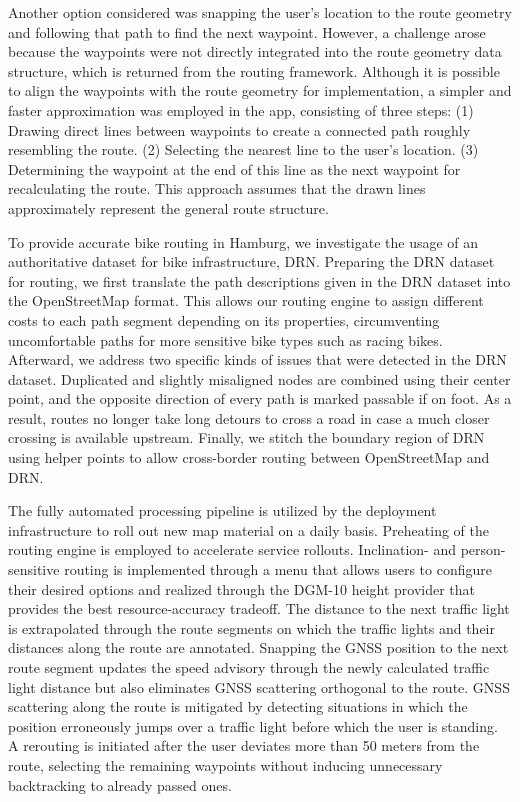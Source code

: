 Another option considered was snapping the user's location to the route geometry and following that path to find the next waypoint. However, a challenge arose because the waypoints were not directly integrated into the route geometry data structure, which is returned from the routing framework. Although it is possible to align the waypoints with the route geometry for implementation, a simpler and faster approximation was employed in the app, consisting of three steps: (1) Drawing direct lines between waypoints to create a connected path roughly resembling the route. (2) Selecting the nearest line to the user's location. (3) Determining the waypoint at the end of this line as the next waypoint for recalculating the route. This approach assumes that the drawn lines approximately represent the general route structure.

\begin{Summary}
To provide accurate bike routing in Hamburg, we investigate the usage of an authoritative dataset for bike infrastructure, DRN. Preparing the DRN dataset for routing, we first translate the path descriptions given in the DRN dataset into the OpenStreetMap format. This allows our routing engine to assign different costs to each path segment depending on its properties, circumventing uncomfortable paths for more sensitive bike types such as racing bikes. Afterward, we address two specific kinds of issues that were detected in the DRN dataset. Duplicated and slightly misaligned nodes are combined using their center point, and the opposite direction of every path is marked passable if on foot. As a result, routes no longer take long detours to cross a road in case a much closer crossing is available upstream. Finally, we stitch the boundary region of DRN using helper points to allow cross-border routing between OpenStreetMap and DRN. 

The fully automated processing pipeline is utilized by the deployment infrastructure to roll out new map material on a daily basis. Preheating of the routing engine is employed to accelerate service rollouts. Inclination- and person-sensitive routing is implemented through a menu that allows users to configure their desired options and realized through the DGM-10 height provider that provides the best resource-accuracy tradeoff. The distance to the next traffic light is extrapolated through the route segments on which the traffic lights and their distances along the route are annotated. Snapping the GNSS position to the next route segment updates the speed advisory through the newly calculated traffic light distance but also eliminates GNSS scattering orthogonal to the route. GNSS scattering along the route is mitigated by detecting situations in which the position erroneously jumps over a traffic light before which the user is standing. A rerouting is initiated after the user deviates more than 50 meters from the route, selecting the remaining waypoints without inducing unnecessary backtracking to already passed ones. 
\end{Summary}


